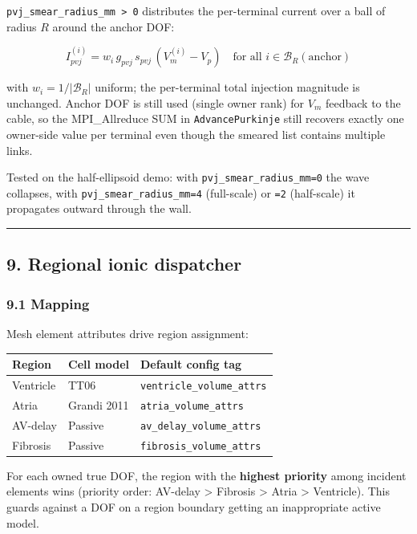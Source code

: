 \documentclass[
  11pt,
]{article}
\begin{document}
\texttt{pvj\_smear\_radius\_mm\ \textgreater{}\ 0} distributes the
per-terminal current over a ball of radius \(R\) around the anchor DOF:

\[I_{pvj}^{(i)} = w_i\, g_{pvj}\, s_{pvj}\, (V_m^{(i)} - V_p)
\quad\text{for all } i \in \mathcal{B}_R(\mathrm{anchor})\]

with \(w_i = 1 / |\mathcal{B}_R|\) uniform; the per-terminal total
injection magnitude is unchanged. Anchor DOF is still used (single owner
rank) for \(V_m\) feedback to the cable, so the MPI\_Allreduce SUM in
\texttt{AdvancePurkinje} still recovers exactly one owner-side value per
terminal even though the smeared list contains multiple links.

Tested on the half-ellipsoid demo: with
\texttt{pvj\_smear\_radius\_mm=0} the wave collapses, with
\texttt{pvj\_smear\_radius\_mm=4} (full-scale) or \texttt{=2}
(half-scale) it propagates outward through the wall.

\begin{center}\rule{0.5\linewidth}{0.5pt}\end{center}

\hypertarget{regional-ionic-dispatcher}{%
\subsection{9. Regional ionic
dispatcher}\label{regional-ionic-dispatcher}}

\hypertarget{mapping}{%
\subsubsection{9.1 Mapping}\label{mapping}}

Mesh element attributes drive region assignment:

\begin{longtable}[]{@{}lll@{}}
\toprule\noalign{}
Region & Cell model & Default config tag \\
\midrule\noalign{}
\endhead
\bottomrule\noalign{}
\endlastfoot
Ventricle & TT06 & \texttt{ventricle\_volume\_attrs} \\
Atria & Grandi 2011 & \texttt{atria\_volume\_attrs} \\
AV-delay & Passive & \texttt{av\_delay\_volume\_attrs} \\
Fibrosis & Passive & \texttt{fibrosis\_volume\_attrs} \\
\end{longtable}

For each owned true DOF, the region with the \textbf{highest priority}
among incident elements wins (priority order: AV-delay \textgreater{}
Fibrosis \textgreater{} Atria \textgreater{} Ventricle). This guards
against a DOF on a region boundary getting an inappropriate active
model.
\end{document}
